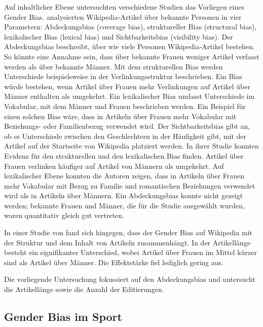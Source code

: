 \documentclass[11pt]{article}
\begin{document}
Auf inhaltlicher Ebene untersuchten verschiedene Studien das Vorliegen eines Gender Bias. \textcite{Wagner2015} analysierten Wikipedia-Artikel über bekannte Personen in vier Parametern: Abdeckungsbias (coverage bias), struktureller Bias (structural bias), lexikalischer Bias (lexical bias) und Sichtbarkeitsbias (visibility bias). Der Abdeckungsbias beschreibt, über wie viele Personen Wikipedia-Artikel bestehen. So könnte eine Annahme sein, dass über bekannte Frauen weniger Artikel verfasst werden als über bekannte Männer. Mit dem strukturellen Bias werden Unterschiede beispielsweise in der Verlinkungsstruktur beschrieben. Ein Bias würde bestehen, wenn Artikel über Frauen mehr Verlinkungen auf Artikel über Männer enthalten als umgekehrt. Ein lexikalischer Bias umfasst Unterschiede im Vokabular, mit dem Männer und Frauen beschrieben werden. Ein Beispiel für einen solchen Bias wäre, dass in Artikeln über Frauen mehr Vokabular mit Beziehungs- oder Familienbezug verwendet wird. Der Sichtbarkeitsbias gibt an, ob es Unterschiede zwischen den Geschlechtern in der Häufigkeit gibt, mit der Artikel auf der Startseite von Wikipedia platziert werden.
In ihrer Studie konnten \textcite{Wagner2015} Evidenz für den strukturellen und den lexikalischen Bias finden. Artikel über Frauen verlinken häufiger auf Artikel von Männern als umgekehrt. Auf lexikalischer Ebene konnten die Autoren zeigen, dass in Artikeln über Frauen mehr Vokabular mit Bezug zu Familie und romantischen Beziehungen verwendet wird als in Artikeln über Männern. Ein Abdeckungsbias konnte nicht gezeigt werden; bekannte Frauen und Männer, die für die Studie ausgewählt wurden, waren quantitativ gleich gut vertreten.

In einer Studie von  \textcite{GraellsGarrido2015} fand sich hingegen, dass der Gender Bias auf Wikipedia mit der Struktur und dem Inhalt von Artikeln zusammenhängt. In der Artikellänge besteht ein signifikanter Unterschied, wobei Artikel über Frauen im Mittel kürzer sind als Artikel über Männer. Die Effektstärke fiel lediglich gering aus.

Die vorliegende Untersuchung fokussiert auf den Abdeckungsbias und untersucht die Artikellänge sowie die Anzahl der Editierungen.

\subsection{Gender Bias im Sport}
\end{document}
